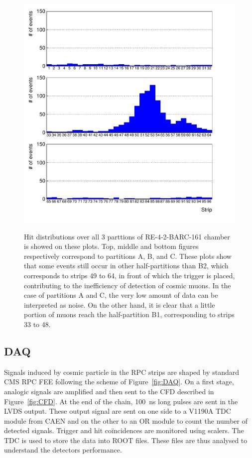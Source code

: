 		\begin{figure}[!h]
			\begin{center}
				\includegraphics[width = 1.2\plotwidth]{fig/Data-21-profile.pdf}\\
				\caption{\label{fig:HitProf} Hit distributions over all 3 parttions of RE-4-2-BARC-161 chamber is showed on these plots. Top, middle and bottom figures respectively correspond to partitions A, B, and C. These plots show that some events still occur in other half-partitions than B2, which corresponds to strips 49 to 64, in front of which the trigger is placed, contributing to the inefficiency of detection of cosmic muons. In the case of partitions A and C, the very low amount of data can be interpreted as noise. On the other hand, it is clear that a little portion of muons reach the half-partition B1, corresponding to strips 33 to 48.}
			\end{center}
		\end{figure}
		
	\subsection{\acl{DAQ}}
	\label{ssec:GIFDAQ}
	
		Signals induced by cosmic particle in the RPC strips are shaped by standard CMS RPC \acf{FEE} following the scheme of Figure~\ref{fig:DAQ}. On a first stage, analogic signals are amplified and then sent to the \acf{CFD} described in Figure~\ref{fig:CFD}. At the end of the chain, \SI{100}{ns} long pulses are sent in the LVDS output. These output signal are sent on one side to a V1190A \acf{TDC} module from CAEN and on the other to an OR module to count the number of detected signals. Trigger and hit coïncidences are monitored using scalers. The TDC is used to store the data into ROOT files. These files are thus analysed to understand the detectors performance.

